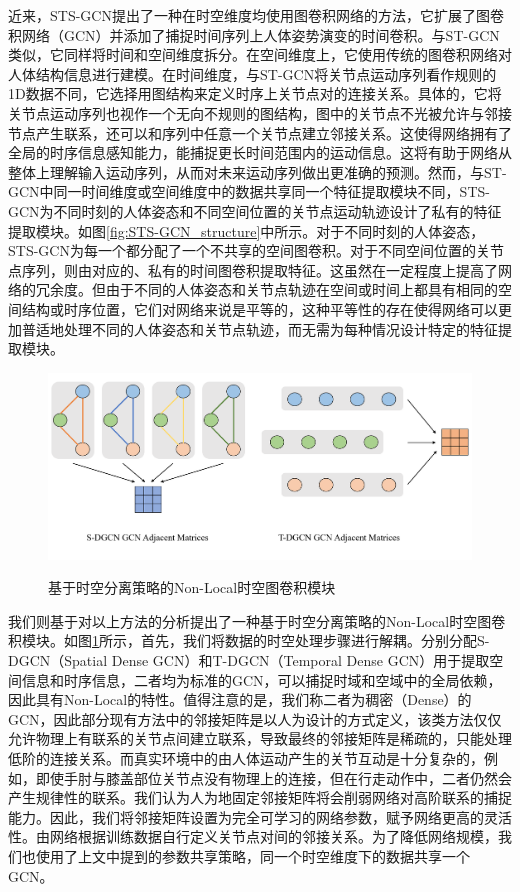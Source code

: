 近来，STS-GCN\cite{sofianos2021space}提出了一种在时空维度均使用图卷积网络的方法，它扩展了图卷积网络（GCN）并添加了捕捉时间序列上人体姿势演变的时间卷积。与ST-GCN类似，它同样将时间和空间维度拆分。在空间维度上，它使用传统的图卷积网络对人体结构信息进行建模。在时间维度，与ST-GCN将关节点运动序列看作规则的1D数据不同，它选择用图结构来定义时序上关节点对的连接关系。具体的，它将关节点运动序列也视作一个无向不规则的图结构，图中的关节点不光被允许与邻接节点产生联系，还可以和序列中任意一个关节点建立邻接关系。这使得网络拥有了全局的时序信息感知能力，能捕捉更长时间范围内的运动信息。这将有助于网络从整体上理解输入运动序列，从而对未来运动序列做出更准确的预测。然而，与ST-GCN中同一时间维度或空间维度中的数据共享同一个特征提取模块不同，STS-GCN为不同时刻的人体姿态和不同空间位置的关节点运动轨迹设计了私有的特征提取模块。如图\ref{fig:STS-GCN_structure}中所示。对于不同时刻的人体姿态，STS-GCN为每一个都分配了一个不共享的空间图卷积。对于不同空间位置的关节点序列，则由对应的、私有的时间图卷积提取特征。这虽然在一定程度上提高了网络的冗余度。但由于不同的人体姿态和关节点轨迹在空间或时间上都具有相同的空间结构或时序位置，它们对网络来说是平等的，这种平等性的存在使得网络可以更加普适地处理不同的人体姿态和关节点轨迹，而无需为每种情况设计特定的特征提取模块。

\begin{figure}[ht]
    \centering
    \includegraphics[width=1\textwidth]{FigMa/Our_gcn.png}\\
    \vspace{-0.3cm}
    \caption{基于时空分离策略的Non-Local时空图卷积模块}
    \label{fig:Our_gcn_structure}
\end{figure}
我们则基于对以上方法的分析提出了一种基于时空分离策略的Non-Local时空图卷积模块。如图\ref{fig:Our_gcn_structure}所示，首先，我们将数据的时空处理步骤进行解耦。分别分配S-DGCN（Spatial Dense GCN）和T-DGCN（Temporal Dense GCN）用于提取空间信息和时序信息，二者均为标准的GCN，可以捕捉时域和空域中的全局依赖，因此具有Non-Local的特性。值得注意的是，我们称二者为稠密（Dense）的GCN，因此部分现有方法\parencite{cui2020learning}中的邻接矩阵是以人为设计的方式定义，该类方法仅仅允许物理上有联系的关节点间建立联系，导致最终的邻接矩阵是稀疏的，只能处理低阶的连接关系。而真实环境中的由人体运动产生的关节互动是十分复杂的，例如，即使手肘与膝盖部位关节点没有物理上的连接，但在行走动作中，二者仍然会产生规律性的联系。我们认为人为地固定邻接矩阵将会削弱网络对高阶联系的捕捉能力。因此，我们将邻接矩阵设置为完全可学习的网络参数，赋予网络更高的灵活性。由网络根据训练数据自行定义关节点对间的邻接关系。为了降低网络规模，我们也使用了上文中提到的参数共享策略，同一个时空维度下的数据共享一个GCN。

